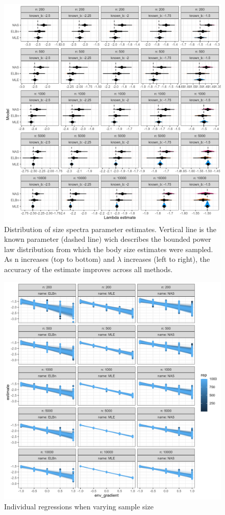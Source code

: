 \documentclass[
]{article}
\begin{document}
\begin{figure}
\centering
\includegraphics{figures/n_vary_est_b.png}
\caption{Distribution of size spectra parameter estimates. Vertical line
is the known parameter (dashed line) wich describes the bounded power
law distribution from which the body size estimates were sampled. As n
increases (top to bottom) and \(\lambda\) increases (left to right), the
accuracy of the estimate improves across all methods.}
\end{figure}

\newpage

\begin{figure}
\centering
\includegraphics{figures/n_vary_main.png}
\caption{Individual regressions when varying sample size}
\end{figure}
\end{document}
